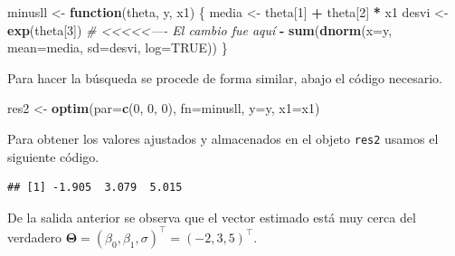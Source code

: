 \documentclass[10pt,]{krantz}
\makeatletter
\newenvironment{Shaded}{\begin{snugshade}}{\end{snugshade}}
\newcommand{\KeywordTok}[1]{\textcolor[rgb]{0.13,0.29,0.53}{\textbf{#1}}}
\newcommand{\DataTypeTok}[1]{\textcolor[rgb]{0.13,0.29,0.53}{#1}}
\newcommand{\DecValTok}[1]{\textcolor[rgb]{0.00,0.00,0.81}{#1}}
\newcommand{\StringTok}[1]{\textcolor[rgb]{0.31,0.60,0.02}{#1}}
\newcommand{\CommentTok}[1]{\textcolor[rgb]{0.56,0.35,0.01}{\textit{#1}}}
\newcommand{\OtherTok}[1]{\textcolor[rgb]{0.56,0.35,0.01}{#1}}
\newcommand{\ControlFlowTok}[1]{\textcolor[rgb]{0.13,0.29,0.53}{\textbf{#1}}}
\newcommand{\OperatorTok}[1]{\textcolor[rgb]{0.81,0.36,0.00}{\textbf{#1}}}
\newcommand{\NormalTok}[1]{#1}
\newenvironment{kframe}{%
\medskip{}
\setlength{\fboxsep}{.8em}
 \def\at@end@of@kframe{}%
 \ifinner\ifhmode%
  \def\at@end@of@kframe{\end{minipage}}%
  \begin{minipage}{\columnwidth}%
 \fi\fi%
 \def\FrameCommand##1{\hskip\@totalleftmargin \hskip-\fboxsep
 \colorbox{shadecolor}{##1}\hskip-\fboxsep
     \hskip-\linewidth \hskip-\@totalleftmargin \hskip\columnwidth}%
 \MakeFramed {\advance\hsize-\width
   \@totalleftmargin\z@ \linewidth\hsize
   \@setminipage}}%
 {\par\unskip\endMakeFramed%
 \at@end@of@kframe}
\renewenvironment{Shaded}{\begin{kframe}}{\end{kframe}}
\makeatother
\begin{document}
\begin{Shaded}
\begin{Highlighting}[]
\NormalTok{minusll <-}\StringTok{ }\ControlFlowTok{function}\NormalTok{(theta, y, x1) \{}
\NormalTok{  media <-}\StringTok{ }\NormalTok{theta[}\DecValTok{1}\NormalTok{] }\OperatorTok{+}\StringTok{ }\NormalTok{theta[}\DecValTok{2}\NormalTok{] }\OperatorTok{*}\StringTok{ }\NormalTok{x1  }
\NormalTok{  desvi <-}\StringTok{ }\KeywordTok{exp}\NormalTok{(theta[}\DecValTok{3}\NormalTok{])  }\CommentTok{# <<<<<---- El cambio fue aquí}
  \OperatorTok{-}\StringTok{ }\KeywordTok{sum}\NormalTok{(}\KeywordTok{dnorm}\NormalTok{(}\DataTypeTok{x=}\NormalTok{y, }\DataTypeTok{mean=}\NormalTok{media, }\DataTypeTok{sd=}\NormalTok{desvi, }\DataTypeTok{log=}\OtherTok{TRUE}\NormalTok{))}
\NormalTok{\}}
\end{Highlighting}
\end{Shaded}

Para hacer la búsqueda se procede de forma similar, abajo el código
necesario.

\begin{Shaded}
\begin{Highlighting}[]
\NormalTok{res2 <-}\StringTok{ }\KeywordTok{optim}\NormalTok{(}\DataTypeTok{par=}\KeywordTok{c}\NormalTok{(}\DecValTok{0}\NormalTok{, }\DecValTok{0}\NormalTok{, }\DecValTok{0}\NormalTok{), }\DataTypeTok{fn=}\NormalTok{minusll, }\DataTypeTok{y=}\NormalTok{y, }\DataTypeTok{x1=}\NormalTok{x1)}
\end{Highlighting}
\end{Shaded}

Para obtener los valores ajustados y almacenados en el objeto
\texttt{res2} usamos el siguiente código.

\begin{Shaded}
\end{Shaded}

\begin{verbatim}
## [1] -1.905  3.079  5.015
\end{verbatim}

De la salida anterior se observa que el vector estimado está muy cerca
del verdadero
\(\boldsymbol{\Theta}=(\beta_0, \beta_1, \sigma)^\top=(-2, 3, 5)^\top\).
\end{document}
